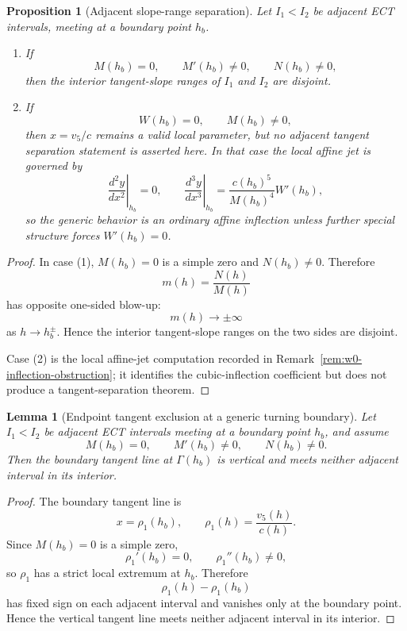 \documentclass[11pt,a4paper]{amsart}
\theoremstyle{plain}
\newtheorem{proposition}[theorem]{Proposition}
\newtheorem{lemma}[theorem]{Lemma}
\theoremstyle{definition}
\begin{document}
\begin{proposition}[Adjacent slope-range separation]
\label{prop:adjacent-slope-range-separation}
Let $I_1<I_2$ be adjacent ECT intervals, meeting at a boundary point $h_b$.

\begin{enumerate}
\item If
\[
M(h_b)=0,\qquad M'(h_b)\neq 0,\qquad N(h_b)\neq 0,
\]
then the interior tangent-slope ranges of $I_1$ and $I_2$ are disjoint.

\item If
\[
W(h_b)=0,\qquad M(h_b)\neq 0,
\]
then $x=v_5/c$ remains a valid local parameter, but no adjacent tangent
separation statement is asserted here. In that case the local affine jet is
governed by
\[
\left.\frac{d^2y}{dx^2}\right|_{h_b}=0,
\qquad
\left.\frac{d^3y}{dx^3}\right|_{h_b}
=
\frac{c(h_b)^5}{M(h_b)^4}W'(h_b),
\]
so the generic behavior is an ordinary affine inflection unless further
special structure forces $W'(h_b)=0$.
\end{enumerate}
\end{proposition}

\begin{proof}
In case (1), $M(h_b)=0$ is a simple zero and $N(h_b)\neq 0$. Therefore
\[
m(h)=\frac{N(h)}{M(h)}
\]
has opposite one-sided blow-up:
\[
m(h)\to \pm\infty
\]
as $h\to h_b^\pm$. Hence the interior tangent-slope ranges on the two sides
are disjoint.

Case (2) is the local affine-jet computation recorded in
Remark~\ref{rem:w0-inflection-obstruction}; it identifies the cubic-inflection
coefficient but does not produce a tangent-separation theorem.
\end{proof}

\begin{lemma}[Endpoint tangent exclusion at a generic turning boundary]
\label{lem:endpoint-tangent-exclusion}
Let $I_1<I_2$ be adjacent ECT intervals meeting at a boundary point $h_b$,
and assume
\[
M(h_b)=0,\qquad M'(h_b)\neq 0,\qquad N(h_b)\neq 0.
\]
Then the boundary tangent line at $\Gamma(h_b)$ is vertical and meets
neither adjacent interval in its interior.
\end{lemma}

\begin{proof}
The boundary tangent line is
\[
x=\rho_1(h_b),
\qquad
\rho_1(h)=\frac{v_5(h)}{c(h)}.
\]
Since $M(h_b)=0$ is a simple zero,
\[
\rho_1'(h_b)=0,\qquad \rho_1''(h_b)\neq 0,
\]
so $\rho_1$ has a strict local extremum at $h_b$. Therefore
\[
\rho_1(h)-\rho_1(h_b)
\]
has fixed sign on each adjacent interval and vanishes only at the boundary
point. Hence the vertical tangent line meets neither adjacent interval in its
interior.
\end{proof}
\end{document}
